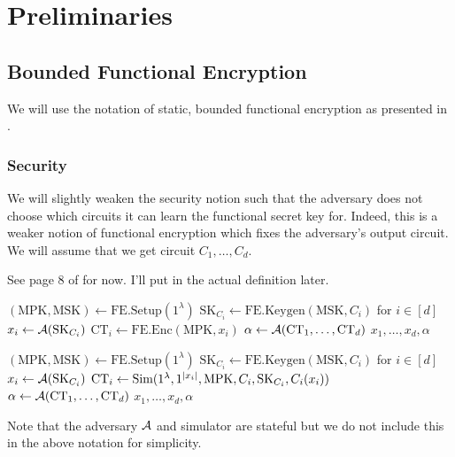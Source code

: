 \newcommand{\MPK}{\text{MPK}}
\newcommand{\MSK}{\text{MSK}}
\newcommand{\SK}{\text{SK}}
\newcommand{\Enc}{\texttt{Enc}}
\newcommand{\Dec}{\texttt{Dec}}
\newcommand{\FEEnc}{\text{FE.Enc}}
\newcommand{\FEDec}{\text{FE.Dec}}
\newcommand{\FESetup}{\text{FE.Setup}}
\newcommand{\FEKeygen}{\text{FE.Keygen}}
\newcommand{\FECT}{\text{CT}}


\section{Preliminaries}
\subsection{Bounded Functional Encryption}
We will use the notation of static, bounded functional encryption as presented in
\cite{agrawal2017functional}.

\subsubsection*{Security}
We will slightly weaken the security notion such that the adversary does not choose
which circuits it can learn the functional secret key for. Indeed, this is a weaker notion of functional encryption
which fixes the adversary's output circuit.
We will assume that we get circuit $C_1, \dots, C_d$.

See page 8 of \cite{agrawal2017functional} for now. I'll put in the actual definition later.


\begin{minipage}{0.46\textwidth}
\begin{algorithm}[H]
    \centering
    \caption*{$\ExpReal(1^\lambda)$}\label{alg:FEExprReal}
    \begin{algorithmic}[1]
        \State $(\MPK, \MSK) \gets \FESetup(1^\lambda)$
				\State $\SK_{C_i} \gets \FEKeygen(\MSK, C_i)$ for $i \in [d]$
				\State $x_i \gets \advers(\SK_{C_i})$
				\State $\FECT_i \gets \FEEnc(\MPK, x_i)$
				\State $\alpha \gets \advers(\FECT_1, \dots, \FECT_d)$
				\State \Return $x_1, \dots, x_d, \alpha$
    \end{algorithmic}
\end{algorithm}
\end{minipage}
\hfill
\begin{minipage}{0.46\textwidth}
\begin{algorithm}[H]
    \centering
    \caption*{$\ExpSim(1^\lambda)$}\label{alg:FEExprSim}
    \begin{algorithmic}[1]
        \State $(\MPK, \MSK) \gets \FESetup(1^\lambda)$
				\State $\SK_{C_i} \gets \FEKeygen(\MSK, C_i)$ for $i \in [d]$
				\State $x_i \gets \advers(\SK_{C_i})$
				\State $\FECT_i \gets \Sim(1^\lambda, 1^{|x_i|}, \MPK, C_i, \SK_{C_i}, C_i(x_i))$
				\State $\alpha \gets \advers(\FECT_1, \dots, \FECT_d)$
				\State \Return $x_1, \dots, x_d, \alpha$
    \end{algorithmic}
\end{algorithm}
\end{minipage}

Note that the adversary $\mathcal{A}$ and simulator are stateful but we do not include this in the above notation for simplicity.
